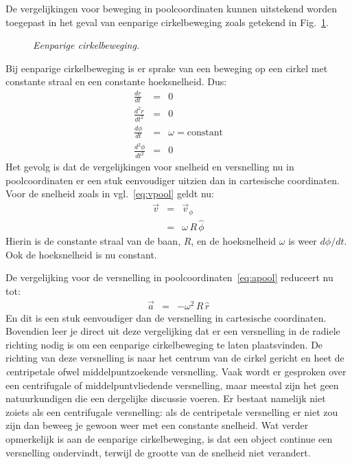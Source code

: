De vergelijkingen voor beweging in poolcoordinaten kunnen uitstekend worden toegepast 
in het geval van eenparige cirkelbeweging zoals getekend in Fig.~\ref{fig:cirkel}. 
 \begin{figure}[htbp]
\begin{center}
\caption{{\it Eenparige cirkelbeweging.}}
\label{fig:cirkel}
\end{center}
\end{figure} 
Bij eenparige 
cirkelbeweging is er sprake van een beweging op een cirkel met constante straal en een
constante hoeksnelheid. Dus:
\begin{eqnarray}
\frac{dr}{dt} & = & 0\\
\frac{d^2r}{dt^2} & = & 0 \\
\frac{d\phi}{dt} &= & \omega = \mbox{constant} \\
\frac{d^2\phi}{dt^2} & = & 0
\end{eqnarray}
Het gevolg is dat de vergelijkingen voor snelheid en versnelling nu in poolcoordinaten er 
een stuk eenvoudiger uitzien dan in cartesische coordinaten. Voor de snelheid zoals in
vgl.~\ref{eq:vpool} geldt nu:
\begin{eqnarray}\label{eq:vpoolcir}
\vec{v} & =&  \vec{v}_{\phi} \\
             & =& \omega\,R\,\hat{\phi}
\end{eqnarray}
Hierin is de constante straal van de baan, $R$, en de hoeksnelheid $\omega$ is weer 
$d\phi / dt$. Ook de hoeksnelheid is nu constant.

De vergelijking  voor de versnelling in poolcoordinaten~\ref{eq:apool} reduceert nu tot:
\begin{eqnarray}\label{eq:apoolcir}
\vec{a} & = & -\omega^2\,R\,\hat{r}
\end{eqnarray}
En dit is een stuk eenvoudiger dan de versnelling in cartesische coordinaten. Bovendien
leer je direct uit deze vergelijking dat er een versnelling in de radiele richting nodig is om een
eenparige cirkelbeweging te laten plaatsvinden. De richting van deze versnelling is naar
het centrum van de cirkel gericht en heet de {\emph centripetale} ofwel middelpuntzoekende
versnelling. Vaak wordt er gesproken over een centrifugale of middelpuntvliedende versnelling,
maar meestal zijn het geen natuurkundigen die een dergelijke discussie voeren. Er bestaat
namelijk niet zoiets als een centrifugale versnelling: als de centripetale versnelling er niet
zou zijn dan beweeg je gewoon weer met een constante snelheid. Wat verder opmerkelijk is 
aan de eenparige cirkelbeweging, is dat een object continue een versnelling ondervindt, 
terwijl de grootte van de snelheid niet verandert.

